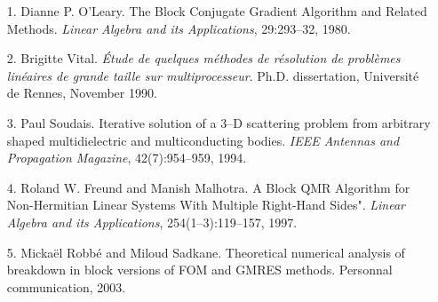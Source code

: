 \documentclass{report}
\begin{document}
\begin{itemize}
\item[1.]
Dianne P. O'Leary.
The Block Conjugate Gradient Algorithm and Related Methods.
\textit{Linear Algebra and its Applications}, 29:293--32, 1980.
\item[2.]
Brigitte Vital.
\textit{\'Etude de quelques m{\'e}thodes de r{\'e}solution de
probl{\`e}mes lin{\'e}aires de grande taille sur multiprocesseur}.
{P}h.{D}. dissertation, Universit{\'e} de Rennes, November 1990.
\item[3.]
Paul Soudais.
Iterative solution of a 3--D scattering problem from arbitrary shaped
multidielectric and multiconducting bodies.
\textit{IEEE Antennas and Propagation Magazine}, 42(7):954--959, 1994.
\item[4.]
Roland W. Freund and Manish Malhotra.
A Block {QMR} Algorithm for Non-{Hermitian} Linear Systems With Multiple
Right-Hand Sides".
\textit{Linear Algebra and its Applications}, 254(1--3):119--157, 1997.
\item[5.]
Micka\"el Robb\'e and Miloud Sadkane.
Theoretical numerical analysis of breakdown in block versions of FOM and GMRES methods.
Personnal communication, 2003.
\end{itemize}
\end{document}
